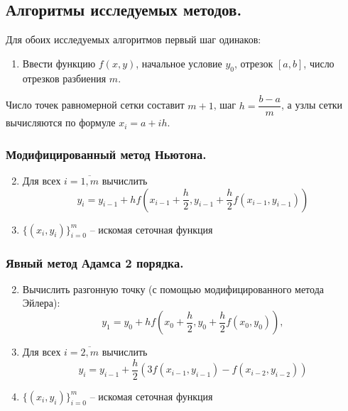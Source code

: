 \documentclass[a4paper, 12pt]{article}
\theoremstyle{mythm}
\begin{document}
	\subsection{Алгоритмы исследуемых методов.}
	
	Для обоих исследуемых алгоритмов первый шаг одинаков:
	\begin{enumerate}
		\item Ввести функцию $f(x,y)$, начальное условие $y_0$, отрезок $[a,b]$, число отрезков разбиения $m$.
	\end{enumerate}
	Число точек равномерной сетки составит $m+1$, шаг $h=\dfrac{b-a}{m}$, а узлы сетки вычисляются по формуле $x_i=a+ih$.	
	
	\subsubsection{Модифицированный метод Ньютона.}
	
	\begin{enumerate}
		\setcounter{enumi}{1}
		\item Для всех $i=\overline{1,m}$ вычислить
		\begin{equation} \label{euler_method}
			y_i = y_{i-1} + hf(x_{i-1} + \frac{h}{2}, y_{i-1}+\frac{h}{2}f(x_{i-1},y_{i-1}))
		\end{equation}
		\item $\{(x_i,y_i)\}_{i=0}^m$ -- искомая сеточная функция
	\end{enumerate}

	\subsubsection{Явный метод Адамса 2 порядка.}
	
	\begin{enumerate}
		\setcounter{enumi}{1}
		\item Вычислить разгонную точку (с помощью модифицированного метода Эйлера):
		\begin{equation} \label{euler_boost}
			y_1 = y_0 + hf(x_0 + \frac{h}{2}, y_0+\frac{h}{2}f(x_0,y_0)),
		\end{equation}
		\item Для всех $i=\overline{2,m}$ вычислить
		\begin{equation} \label{adams_method}
			y_i = y_{i-1} + \frac{h}{2}(3f(x_{i-1},y_{i-1})-f(x_{i-2}, y_{i-2}))
		\end{equation}
		\item $\{(x_i,y_i)\}_{i=0}^m$ -- искомая сеточная функция
	\end{enumerate}
	
\end{document}

